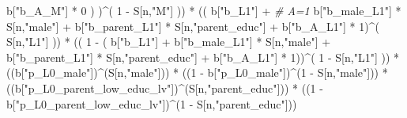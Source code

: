 \documentclass[
]{book}
\newenvironment{Shaded}{\begin{snugshade}}{\end{snugshade}}
\newcommand{\CommentTok}[1]{\textcolor[rgb]{0.56,0.35,0.01}{\textit{#1}}}
\newcommand{\DecValTok}[1]{\textcolor[rgb]{0.00,0.00,0.81}{#1}}
\newcommand{\NormalTok}[1]{#1}
\newcommand{\SpecialCharTok}[1]{\textcolor[rgb]{0.00,0.00,0.00}{#1}}
\newcommand{\StringTok}[1]{\textcolor[rgb]{0.31,0.60,0.02}{#1}}
\begin{document}
\begin{Shaded}
\begin{Highlighting}[]
\NormalTok{                b[}\StringTok{"b\_A\_M"}\NormalTok{] }\SpecialCharTok{*} \DecValTok{0}\NormalTok{ ) )}\SpecialCharTok{\^{}}\NormalTok{( }\DecValTok{1} \SpecialCharTok{{-}}\NormalTok{ S[n,}\StringTok{"M"}\NormalTok{] )) }\SpecialCharTok{*}
\NormalTok{      (( b[}\StringTok{"b\_L1"}\NormalTok{] }\SpecialCharTok{+}                                                            \CommentTok{\# A=1}
\NormalTok{           b[}\StringTok{"b\_male\_L1"}\NormalTok{] }\SpecialCharTok{*}\NormalTok{ S[n,}\StringTok{"male"}\NormalTok{] }\SpecialCharTok{+}  
\NormalTok{           b[}\StringTok{"b\_parent\_L1"}\NormalTok{] }\SpecialCharTok{*}\NormalTok{ S[n,}\StringTok{"parent\_educ"}\NormalTok{] }\SpecialCharTok{+}
\NormalTok{           b[}\StringTok{"b\_A\_L1"}\NormalTok{] }\SpecialCharTok{*} \DecValTok{1}\NormalTok{)}\SpecialCharTok{\^{}}\NormalTok{( S[n,}\StringTok{"L1"}\NormalTok{] )) }\SpecialCharTok{*}
\NormalTok{      (( }\DecValTok{1} \SpecialCharTok{{-}}\NormalTok{ ( b[}\StringTok{"b\_L1"}\NormalTok{] }\SpecialCharTok{+}
\NormalTok{                 b[}\StringTok{"b\_male\_L1"}\NormalTok{] }\SpecialCharTok{*}\NormalTok{ S[n,}\StringTok{"male"}\NormalTok{] }\SpecialCharTok{+}  
\NormalTok{                 b[}\StringTok{"b\_parent\_L1"}\NormalTok{] }\SpecialCharTok{*}\NormalTok{ S[n,}\StringTok{"parent\_educ"}\NormalTok{] }\SpecialCharTok{+}
\NormalTok{                 b[}\StringTok{"b\_A\_L1"}\NormalTok{] }\SpecialCharTok{*} \DecValTok{1}\NormalTok{))}\SpecialCharTok{\^{}}\NormalTok{( }\DecValTok{1} \SpecialCharTok{{-}}\NormalTok{ S[n,}\StringTok{"L1"}\NormalTok{] )) }\SpecialCharTok{*}
\NormalTok{      ((b[}\StringTok{"p\_L0\_male"}\NormalTok{])}\SpecialCharTok{\^{}}\NormalTok{(S[n,}\StringTok{"male"}\NormalTok{])) }\SpecialCharTok{*} 
\NormalTok{      ((}\DecValTok{1} \SpecialCharTok{{-}}\NormalTok{ b[}\StringTok{"p\_L0\_male"}\NormalTok{])}\SpecialCharTok{\^{}}\NormalTok{(}\DecValTok{1} \SpecialCharTok{{-}}\NormalTok{ S[n,}\StringTok{"male"}\NormalTok{])) }\SpecialCharTok{*} 
\NormalTok{      ((b[}\StringTok{"p\_L0\_parent\_low\_educ\_lv"}\NormalTok{])}\SpecialCharTok{\^{}}\NormalTok{(S[n,}\StringTok{"parent\_educ"}\NormalTok{])) }\SpecialCharTok{*}
\NormalTok{      ((}\DecValTok{1} \SpecialCharTok{{-}}\NormalTok{ b[}\StringTok{"p\_L0\_parent\_low\_educ\_lv"}\NormalTok{])}\SpecialCharTok{\^{}}\NormalTok{(}\DecValTok{1} \SpecialCharTok{{-}}\NormalTok{ S[n,}\StringTok{"parent\_educ"}\NormalTok{])) }
    

\end{Highlighting}
\end{Shaded}
\end{document}
